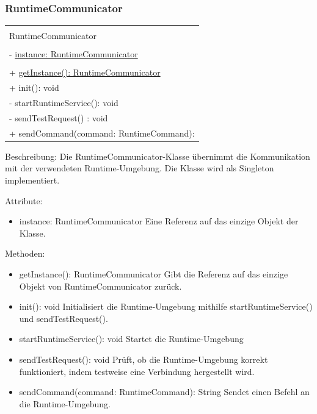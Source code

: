 \documentclass[a4paper,20pt,oneside]{book}
\begin{document}
	\subsubsection{RuntimeCommunicator}
	\centering
	\begin{tabular}{|l|}
	\hline \\
	RuntimeCommunicator \\
	\hline \\
	- \uline{instance: RuntimeCommunicator} \\
	\hline \\
	+ \uline{getInstance(): RuntimeCommunicator} \\
	+ init(): void \\
	- startRuntimeService(): void \\
	- sendTestRequest() : void \\
	+ sendCommand(command: RuntimeCommand): \\
	\hline 
	\end{tabular}
	
	\raggedright
	\vspace{0.5cm}
	
	Beschreibung:
	\linebreak Die RuntimeCommunicator-Klasse übernimmt die Kommunikation mit der verwendeten Runtime-Umgebung. Die Klasse wird als Singleton implementiert.
	\vspace{0.5cm}	
	
	Attribute:
	\begin{itemize}
	\item instance: RuntimeCommunicator
	\linebreak Eine Referenz auf das einzige Objekt der Klasse.
	\end{itemize}
	
	Methoden:
	\begin{itemize}
	\item getInstance(): RuntimeCommunicator
	\linebreak Gibt die Referenz auf das einzige Objekt von RuntimeCommunicator zurück.
	\item init(): void
	\linebreak Initialisiert die Runtime-Umgebung mithilfe startRuntimeService() und sendTestRequest().
	\item startRuntimeService(): void
	\linebreak Startet die Runtime-Umgebung
	\item sendTestRequest(): void
	\linebreak Prüft, ob die Runtime-Umgebung korrekt funktioniert, indem testweise eine Verbindung hergestellt wird.  
	\item sendCommand(command: RuntimeCommand): String
	\linebreak Sendet einen Befehl an die Runtime-Umgebung.
	\end{itemize}			
	
\end{document}
